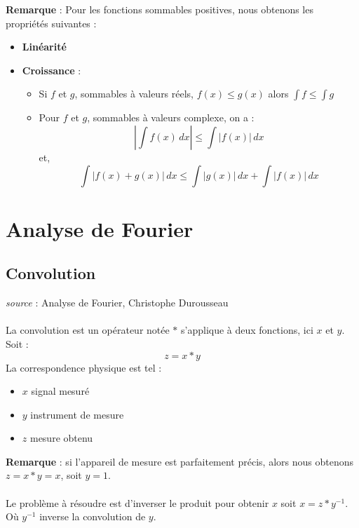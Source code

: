 \documentclass[a4paper]{book}
\begin{document}
\textbf{Remarque} : Pour les fonctions sommables positives, nous obtenons les
propriétés suivantes :
\begin{itemize}
	\item \textbf{Linéarité}
	\item \textbf{Croissance} : 
		\begin{itemize}
			\item Si $f$ et $g$, sommables à valeurs réels, $f(x)
				\leq g(x)$ alors $\int f \leq \int g$
			\item Pour $f$ et $g$, sommables à valeurs complexe, on
				a : 
				\begin{equation}
					| \int f(x) \,dx | \leq \int |f(x)|\,dx
				\end{equation}
				et,
				\begin{equation}
					\int |f(x)+g(x)| \,dx \leq  
						\int |g(x)|\,dx + \int |f(x)|\,dx
				\end{equation}


		\end{itemize}
\end{itemize}


\part{Analyse de Fourier}
\chapter{Convolution}
\emph{source} : Analyse de Fourier, Christophe Durousseau\\
\\
La convolution est un opérateur notée $*$ s'applique à deux fonctions, ici $x$
et $y$. Soit :
\begin{equation}
	z = x * y
\end{equation}
La correspondence physique est tel :
\begin{itemize}
	\item $x$ signal mesuré
	\item $y$ instrument de mesure
	\item $z$ mesure obtenu
\end{itemize}
\textbf{Remarque} : si l'appareil de mesure est parfaitement précis, alors nous
obtenons $z = x * y = x$, soit $y = 1$.\\
\\
Le problème à résoudre est d'inverser le produit pour obtenir $x$ soit $x = z *
y^{-1}$. Où $y^{-1}$ inverse la convolution de $y$.
\end{document}
